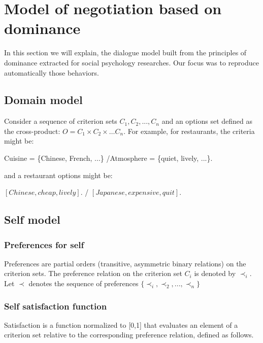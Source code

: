 \documentclass{llncs}
\begin{document}
	
	\section{Model of negotiation based on dominance}
	In this section we will explain, the dialogue model built from the principles of dominance extracted for social psychology researches. Our focus was to reproduce automatically those behaviors.
	\subsection{Domain model}
	Consider a sequence of criterion sets $C_1, C_2, ..., C_n$ and an options set defined as the cross-product:
	$O = C_1 \times C_2 \times \ldots C_n$.
	For example, for restaurants, the criteria might be:
	
	Cuisine = \{Chinese, French, ...\} /Atmosphere = \{quiet, lively, ...\}. 
	
	and a restaurant options might be: 
	
	$[Chinese, cheap, lively]$. / $[Japanese, expensive, quit]$.   
	\subsection{Self model} 
	
	\subsubsection{Preferences for self}
	Preferences are partial orders (transitive, asymmetric binary relations) on the criterion sets. The preference relation on the criterion set $C_i$ is denoted by $\prec_i$.			
	Let $\prec$ denotes the sequence of preferences $\{ \prec_i, \prec_2, ..., \prec_n\}$
	
	\subsubsection{Self satisfaction function} 
	
	Satisfaction is a function normalized to [0,1] that evaluates an element of a criterion set relative to the corresponding preference relation, defined as follows.
	
\end{document}
